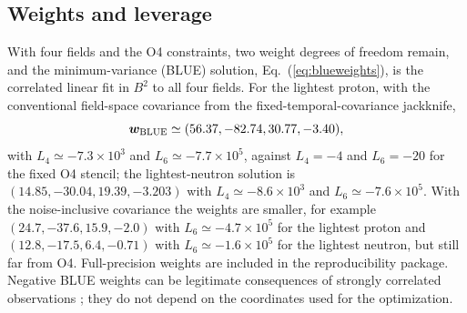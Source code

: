 \documentclass[aps,prd,reprint,twocolumn,superscriptaddress,nofootinbib,longbibliography]{revtex4-2}
\begin{document}
\subsection{Weights and leverage}

With four fields and the O4 constraints, two weight degrees of freedom remain, and the minimum-variance (BLUE) solution, Eq.~(\ref{eq:blueweights}), is the correlated linear fit in $B^2$ to all four fields. For the lightest proton, with the conventional field-space covariance from the fixed-temporal-covariance jackknife,
\begin{equation}
\bm w_{\rm BLUE}\simeq(56.37,-82.74,30.77,-3.40),
\end{equation}
with $L_4\simeq-7.3\times10^3$ and $L_6\simeq-7.7\times10^5$, against $L_4=-4$ and $L_6=-20$ for the fixed O4 stencil; the lightest-neutron solution is $(14.85,-30.04,19.39,-3.203)$ with $L_4\simeq-8.6\times10^3$ and $L_6\simeq-7.6\times10^5$. With the noise-inclusive covariance the weights are smaller, for example $(24.7,-37.6,15.9,-2.0)$ with $L_6\simeq-4.7\times10^5$ for the lightest proton and $(12.8,-17.5,6.4,-0.71)$ with $L_6\simeq-1.6\times10^5$ for the lightest neutron, but still far from O4. Full-precision weights are included in the reproducibility package. Negative BLUE weights can be legitimate consequences of strongly correlated observations \cite{ValassiChierici2014}; they do not depend on the coordinates used for the optimization.
\end{document}
